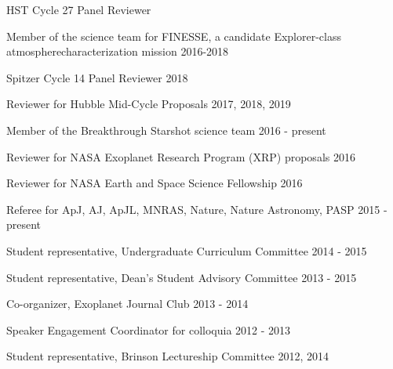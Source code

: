 \documentclass[12pt,letterpaper]{article}
\begin{document}
\begin{compactitem}[]
\item{HST Cycle 27 Panel Reviewer}
\item {Member of the science team for FINESSE, a candidate Explorer-class atmosphere\newline characterization mission \hfill 2016-2018}
\item {Spitzer Cycle 14 Panel Reviewer \hfill 2018}
\item {Reviewer for Hubble Mid-Cycle Proposals \hfill 2017, 2018, 2019}
\item {Member of the Breakthrough Starshot science team \hfill 2016 - present}
\item Reviewer for NASA Exoplanet Research Program (XRP) proposals \hfill	2016
\item Reviewer for NASA Earth and Space Science Fellowship \hfill 2016
\item Referee for ApJ, AJ, ApJL, MNRAS, Nature, Nature Astronomy, PASP \hfill 2015 - present
\item Student representative, Undergraduate Curriculum Committee \hfill 2014 - 2015
\item Student representative, Dean's Student Advisory Committee \hfill 2013 - 2015
\item Co-organizer, Exoplanet Journal Club \hfill 2013 - 2014
\item Speaker Engagement Coordinator for colloquia \hfill 2012 - 2013
\item Student representative, Brinson Lectureship Committee \hfill 2012, 2014
\end{compactitem}
\end{document}
